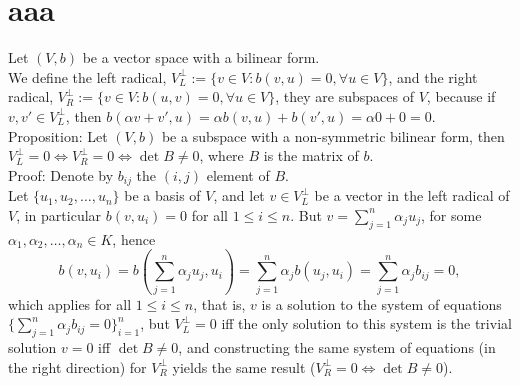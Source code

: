 \documentclass{article}
\begin{document}
\section*{aaa}
Let $(V,b)$ be a vector space with a bilinear form.\\
We define the left radical, $V^{\perp}_L:=\{v\in{V} : b(v,u)=0,\forall{u}\in{V}\}$, and the right radical, $V^{\perp}_R:=\{v\in{V} : b(u,v)=0,\forall{u}\in{V}\}$, they are subspaces of $V$, because if $v,v'\in{V}^{\perp}_L$, then $b(\alpha{v}+v',u)=\alpha{b}(v,u)+b(v',u)=\alpha0+0=0$.\\
Proposition: Let $(V,b)$ be a subspace with a non-symmetric bilinear form, then $V_L^{\perp}=0\iff{V}_R^{\perp}=0\iff\det{B}\neq{0}$, where $B$ is the matrix of $b$.\\
Proof: Denote by $b_{ij}$ the $(i,j)$ element of $B$.\\
Let $\{u_1,u_2,\dots,u_n\}$ be a basis of $V$, and let $v\in{V_L^{\perp}}$ be a vector in the left radical of $V$, in particular $b(v,u_i)=0$ for all $1\leq{i}\leq{n}$.
But $v=\sum_{j=1}^n\alpha_ju_j$, for some $\alpha_1,\alpha_2,\dots,\alpha_n\in{K}$, hence \[b(v,u_i)=b(\sum_{j=1}^n\alpha_ju_j,u_i)=\sum_{j=1}^n\alpha_jb(u_j,u_i)=\sum_{j=1}^n\alpha_jb_{ij}=0,\]
which applies for all $1\leq{i}\leq{n}$, that is, $v$ is a solution to the system of equations $\{\sum_{j=1}^n\alpha_jb_{ij}=0\}_{i=1}^n$, but $V_L^{\perp}=0$ iff the only solution to this system is the trivial solution $v=0$ iff $\det{B}\neq0$, and constructing the same system of equations (in the right direction) for $V_R^{\perp}$ yields the same result ($V_R^{\perp}=0\iff\det{B}\neq0$).
\end{document}
